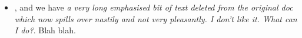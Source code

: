 \documentclass[11pt,a4paper,twoside,notitlepage]{article}
\begin{document}
\begin{itemize}

\item , and we have
\emph{a very long emphasised bit of text deleted from the original doc which now
spills over nastily and not very pleasantly. I don't like it. What can I do?}.
Blah blah.  

\end{itemize}
\end{document}

